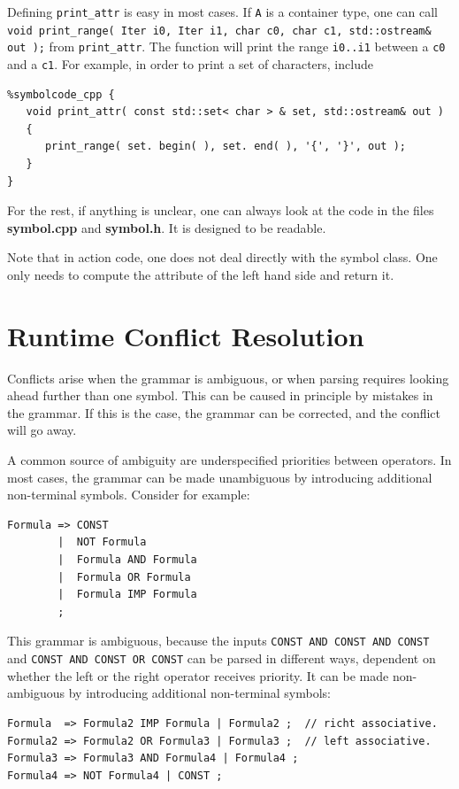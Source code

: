 \documentclass{article}
\begin{document}
\noindent
Defining \verb+print_attr+ is easy in most cases. 
If \verb+A+ is a container type, one can call \\
\verb+void print_range( Iter i0, Iter i1, char c0, char c1, std::ostream& out );+
from \verb+print_attr+. 
The function will print the range \verb+i0..i1+
between a \verb+c0+ and a \verb+c1+. 
For example, in order to print a set of characters, include 
\begin{verbatim}
%symbolcode_cpp {
   void print_attr( const std::set< char > & set, std::ostream& out )
   {
      print_range( set. begin( ), set. end( ), '{', '}', out );
   }
} \end{verbatim}
For the rest, if anything is unclear, one can always look at
the code in the files {\bf symbol.cpp} and {\bf symbol.h}.
It is designed to be readable. 

Note that in action code, one does not deal directly with
the symbol class. One only needs to compute the
attribute of the left hand side and return it. 

\section{Runtime Conflict Resolution}
\label{Sect_runtime}

Conflicts arise when the grammar is ambiguous,
or when parsing requires looking ahead further than one symbol.
This can be caused in principle by mistakes in the grammar. 
If this is the case, the grammar can be corrected,
and the conflict will go away. 

A common source of ambiguity are underspecified priorities
between operators. In most cases, the grammar can
be made unambiguous by introducing additional
non-terminal symbols. Consider for example:  
\begin{verbatim}
Formula => CONST    
        |  NOT Formula                
        |  Formula AND Formula    
        |  Formula OR Formula   
        |  Formula IMP Formula
        ;
\end{verbatim}
This grammar is ambiguous, because the 
inputs \verb|CONST AND CONST AND CONST|
and \verb|CONST AND CONST OR CONST| can
be parsed in different ways, 
dependent on whether the left or the 
right operator receives priority.
It can be made non-ambiguous
by introducing additional non-terminal symbols: 
\begin{verbatim}
Formula  => Formula2 IMP Formula | Formula2 ;  // richt associative.
Formula2 => Formula2 OR Formula3 | Formula3 ;  // left associative.
Formula3 => Formula3 AND Formula4 | Formula4 ;
Formula4 => NOT Formula4 | CONST ;
\end{verbatim}
\end{document}
